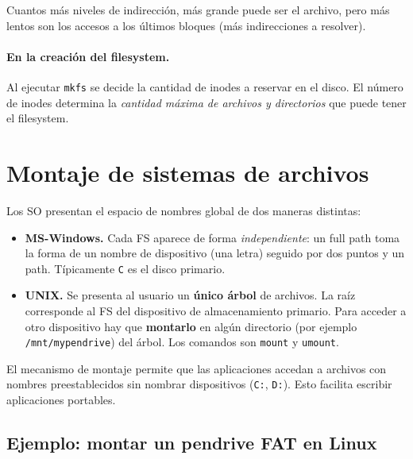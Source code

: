 \documentclass[11pt,a4paper]{article}
\begin{document}
Cuantos más niveles de indirección, más grande puede ser el archivo,
pero más lentos son los accesos a los últimos bloques (más
indirecciones a resolver).

\paragraph{En la creación del filesystem.}
Al ejecutar \texttt{mkfs} se decide la cantidad de inodes a reservar en
el disco. El número de inodes determina la \emph{cantidad máxima de
archivos y directorios} que puede tener el filesystem.

\section{Montaje de sistemas de archivos}

Los SO presentan el espacio de nombres global de dos maneras distintas:

\begin{itemize}[leftmargin=*]
    \item \textbf{MS-Windows.} Cada FS aparece de forma
        \emph{independiente}: un full path toma la forma de un nombre
        de dispositivo (una letra) seguido por dos puntos y un path.
        Típicamente \texttt{C} es el disco primario.
    \item \textbf{UNIX.} Se presenta al usuario un \textbf{único árbol}
        de archivos. La raíz corresponde al FS del dispositivo de
        almacenamiento primario. Para acceder a otro dispositivo hay
        que \textbf{montarlo} en algún directorio (por ejemplo
        \texttt{/mnt/mypendrive}) del árbol. Los comandos son
        \texttt{mount} y \texttt{umount}.
\end{itemize}

\begin{idea}
El mecanismo de montaje permite que las aplicaciones accedan a
archivos con nombres preestablecidos sin nombrar dispositivos
(\texttt{C:}, \texttt{D:}). Esto facilita escribir aplicaciones
portables.
\end{idea}

\subsection{Ejemplo: montar un pendrive FAT en Linux}
\end{document}
